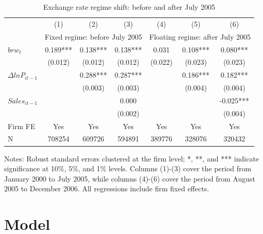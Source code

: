 \begin{table}[htbp]
    \centering
    \caption{Exchange rate regime shift: before and after July 2005}
    \begin{threeparttable}
    \begin{tabular}{lcccccc}
        \toprule
        & (1)   & (2)   & (3)   & (4)   & (5)   & (6) \\
        & \multicolumn{3}{c}{Fixed regime: before July 2005} & \multicolumn{3}{c}{Floating regime: after July 2005}  \\
        \midrule
        $brw_t$   & 0.189*** & 0.138*** & 0.138*** & 0.031 & 0.108*** & 0.080*** \\
              & (0.012) & (0.012) & (0.012) & (0.022) & (0.023) & (0.023) \\
        $\Delta ln P_{it-1}$ &       & 0.288*** & 0.287*** &       & 0.186*** & 0.182*** \\
              &       & (0.003) & (0.003) &       & (0.004) & (0.004) \\
        $Sales_{it-1}$ &       &       & 0.000 &       &       & -0.025*** \\
              &       &       & (0.002) &       &       & (0.004) \\
        \midrule
        Firm FE & Yes   & Yes   & Yes   & Yes   & Yes   & Yes \\
        N     & 708254 & 609726 & 594891 & 389776 & 328076 & 320432 \\
        \bottomrule
    \end{tabular}
        \begin{tablenotes}
            \footnotesize
            \item Notes: Robust standard errors clustered at the firm level;  *, **, and *** indicate significance at 10\%, 5\%, and 1\% levels. Columns (1)-(3) cover the period from January 2000 to July 2005, while columns (4)-(6) cover the period from August 2005 to December 2006. All regressions include firm fixed effects.
	\end{tablenotes}
    \end{threeparttable}
    \label{tab.regime}
\end{table}


\newpage
\section{Model}

